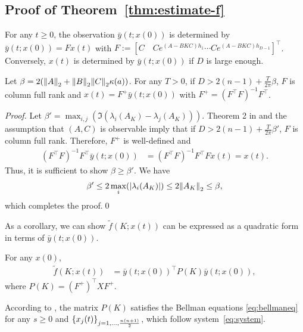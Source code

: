 \subsection{Proof of Theorem~\ref{thm:estimate-f}}\label{proof:thm:estimate-f}
For any $t \geq 0$, the observation $\bar y(t;x(0))$ is determined by
    $\bar y(t;x(0)) = Fx(t)$
with $F := [C \quad Ce^{(A-BKC) h_1} \cdots Ce^{(A-BKC) h_{D-1}}]^\top$. 
Conversely, $x(t)$ is determined by $\bar y(t;x(0))$ if $D$ is large enough.
\begin{lemma}\label{lem:reconstruction}
  Let $\beta = 2(\norm{A}_2+\norm{B}_2\norm{C}_2\kappa(a))$.
  For any $T>0$, if $D>2(n-1)+\frac{T}{2\pi}\beta$, $F$ is column full rank and
    $x(t)  = F^+\bar y(t;x(0))$
  with $F^+ = (F^\top F)^{-1}F^\top$. 
\end{lemma}
\begin{proof}
  Let $\beta' = \max_{i, j}(\Im(\lambda_i(A_K)-\lambda_j(A_K)))$.
   Theorem 2 in \cite{modares2016optimal}
   and the assumption that $(A, C)$ is observable
   imply that if $D>2(n-1)+\frac{T}{2\pi}\beta'$,
   $F$ is column full rank.
  Therefore, $F^+$ is well-defined and
  \begin{align}
      (F^\top F)^{-1}F^\top\bar y(t;x(0)) &= (F^\top F)^{-1}F^\top F x(t) = x(t).
  \end{align}
  Thus, it is sufficient to show $\beta \geq \beta'$.
  We have
  \begin{align}
      \beta' \leq 2\max_{i}(|\lambda_i(A_K)|)\leq 2\norm{A_K}_2\leq \beta,
  \end{align}
  which completes the proof.\qed
\end{proof}

As a corollary, we can show $\tilde f(K;x(t))$ can be expressed as a quadratic form in terms of $\bar y(t;x(0))$.
\begin{corollary}\label{cor:f-from-y-bar}
  For any $x(0)$,
  \begin{align}
    \tilde f(K;x(t)) & = \bar y(t;x(0))^\top P(K)\bar y(t;x(0)),\label{eq:f-from-y-bar}
  \end{align}
  where $P(K) = (F^+)^\top X F^+$.
\end{corollary}

According to \cite{modares2016optimal}, the matrix $P(K)$ satisfies the Bellman equations \eqref{eq:bellmaneq}
for any $s \geq 0$ and $\qty{x_j(t)}_{j=1, \dots, \frac{n(n+1)}{2}}$, which follow system~\eqref{eq:system}.


